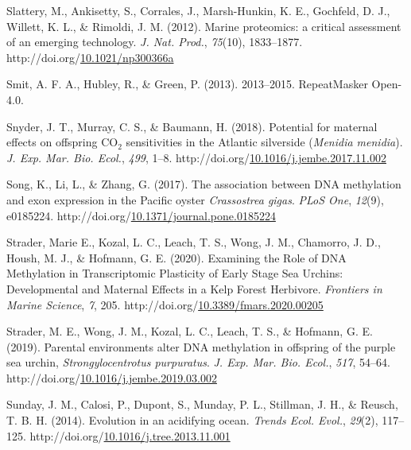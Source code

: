 \documentclass [11pt, proquest] {uwthesis}[2015/03/03]
\newlength{\cslhangindent}
\newenvironment{CSLReferences}%
{\setlength{\parindent}{0pt}%
\everypar{\setlength{\hangindent}{\cslhangindent}}\ignorespaces}%
{\par}
\begin{document}
\begin{CSLReferences}{1}{0}
\leavevmode\hypertarget{ref-Slattery2012}{}%
Slattery, M., Ankisetty, S., Corrales, J., Marsh-Hunkin, K. E., Gochfeld, D. J., Willett, K. L., \& Rimoldi, J. M. (2012). {Marine proteomics: a critical assessment of an emerging technology}. \emph{J. Nat. Prod.}, \emph{75}(10), 1833--1877. http://doi.org/\href{https://doi.org/10.1021/np300366a}{10.1021/np300366a}

\leavevmode\hypertarget{ref-Smit2013}{}%
Smit, A. F. A., Hubley, R., \& Green, P. (2013). {2013--2015. RepeatMasker Open-4.0}.

\leavevmode\hypertarget{ref-Snyder2018}{}%
Snyder, J. T., Murray, C. S., \& Baumann, H. (2018). {Potential for maternal effects on offspring {CO\(_2\)} sensitivities in the Atlantic silverside (\emph{Menidia menidia})}. \emph{J. Exp. Mar. Bio. Ecol.}, \emph{499}, 1--8. http://doi.org/\href{https://doi.org/10.1016/j.jembe.2017.11.002}{10.1016/j.jembe.2017.11.002}

\leavevmode\hypertarget{ref-Song2017}{}%
Song, K., Li, L., \& Zhang, G. (2017). {The association between DNA methylation and exon expression in the Pacific oyster \emph{Crassostrea gigas}}. \emph{PLoS One}, \emph{12}(9), e0185224. http://doi.org/\href{https://doi.org/10.1371/journal.pone.0185224}{10.1371/journal.pone.0185224}

\leavevmode\hypertarget{ref-Strader2020}{}%
Strader, Marie E., Kozal, L. C., Leach, T. S., Wong, J. M., Chamorro, J. D., Housh, M. J., \& Hofmann, G. E. (2020). {Examining the Role of DNA Methylation in Transcriptomic Plasticity of Early Stage Sea Urchins: Developmental and Maternal Effects in a Kelp Forest Herbivore}. \emph{Frontiers in Marine Science}, \emph{7}, 205. http://doi.org/\href{https://doi.org/10.3389/fmars.2020.00205}{10.3389/fmars.2020.00205}

\leavevmode\hypertarget{ref-Strader2019}{}%
Strader, M. E., Wong, J. M., Kozal, L. C., Leach, T. S., \& Hofmann, G. E. (2019). {Parental environments alter DNA methylation in offspring of the purple sea urchin, \emph{Strongylocentrotus purpuratus}}. \emph{J. Exp. Mar. Bio. Ecol.}, \emph{517}, 54--64. http://doi.org/\href{https://doi.org/10.1016/j.jembe.2019.03.002}{10.1016/j.jembe.2019.03.002}

\leavevmode\hypertarget{ref-Sunday2014}{}%
Sunday, J. M., Calosi, P., Dupont, S., Munday, P. L., Stillman, J. H., \& Reusch, T. B. H. (2014). {Evolution in an acidifying ocean}. \emph{Trends Ecol. Evol.}, \emph{29}(2), 117--125. http://doi.org/\href{https://doi.org/10.1016/j.tree.2013.11.001}{10.1016/j.tree.2013.11.001}


\end{CSLReferences}
\end{document}
